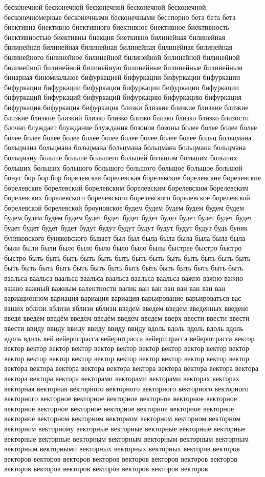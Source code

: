 бесконечной бесконечной бесконечной бесконечной бесконечной бесконечномерные бесконечными бесконечными бесспорно бета бета бета биективна биективно биективного биективное биективное биективность биективностью биективны биекция биеткивно билинейная билинейная билинейная билинейная билинейная билинейная билинейная билинейная билинейного билинейное билинейной билинейной билинейной билинейной билинейной билинейной билинейную билинейные билинейные билинейным бинарная биномиальное бифуркацией бифуркации бифуркации бифуркации бифуркации бифуркации бифуркации бифуркации бифуркации бифуркации бифуркаций бифуркаций бифуркаций бифуркацию бифуркацию бифуркация бифуркация бифуркация бифуркация близки близкие близкие близкие близкие близкие близкие близкий близко близко близко близко близко близко близости блочно блуждает блуждание блуждания бозонов бозоны более более более более более более более более более более более более более более больц больцмана больцмана больцмана больцмана больцмана больцмана больцмана больцмана больцману больше больше большего большей большим большим больших больших больших большого большого большого большое большое большой бонус бор бор бор борелевская борелевская борелевские борелевские борелевские борелевские борелевский борелевским борелевским борелевским борелевским борелевских борелевского борелевского борелевского борелевское борелевской борелевской борелевской броуновское будем будем будем будем будем будем будем будем будем будем будет будет будет будет будет будет будет будет будет будет будет будет будет будут будут будут будут будут будут будут будь буняк буняковского буняковского бывает был был была была была была была была были были были было было было было было былы быстрее быстро быстро быстро быть быть быть быть быть быть быть быть быть быть быть быть быть быть быть быть быть быть быть быть быть быть быть быть быть быть быть ваальса ваальса ваальса ваальса ваальса ваальса ваальса важно важно важно важно важный важным валентности валик ван ван ван ван ван ван ван вариационном вариация вариация вариация варьирование варьироваться вас ваших вблизи вблизи вблизи вблизи введем введем введем введенных введено введя введём введём введём введём введём введём вверх ввести ввести ввести ввести ввиду ввиду ввиду ввиду ввиду ввиду вдоль вдоль вдоль вдоль вдоль вдоль вдоль вей вейерштрасса вейерштрасса вейерштрасса вейерштрасса вектор вектор вектор вектор вектор вектор вектор вектор вектор вектор вектор вектор вектор вектор вектор вектор вектор вектор вектор вектор вектор вектор вектор вектора вектора вектора вектора вектора вектора вектора вектора вектора вектора вектора вектора вектора векторами векторами векторами векторах векторах векторная векторная векторного векторного векторного векторного векторного векторного векторное векторное векторное векторное векторное векторное векторное векторное векторное векторное векторное векторное векторное векторное векторном векторном векторном векторном векторном векторном векторном векторному векторные векторные векторные векторные векторные векторные векторные векторным векторным векторным векторным векторным векторным векторными векторных векторных векторных векторов векторов векторов векторов векторов векторов векторов векторов векторов векторов векторов векторов векторов векторов векторов векторов векторов 